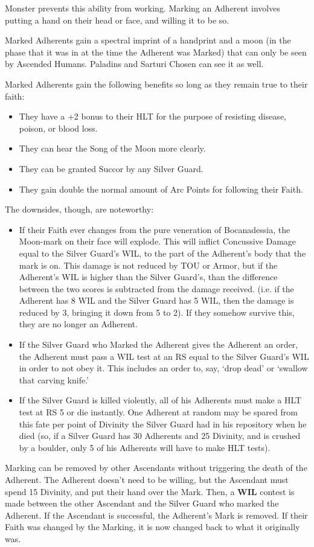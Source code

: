 \documentclass[oneside,11pt,english]{book}
\begin{document}
Monster prevents this ability from working. Marking an Adherent involves putting a hand on 
their head or face, and willing it to be so. 


Marked Adherents gain a spectral imprint of a handprint and a moon (in the phase that it was in at 
the time the Adherent was Marked) that can only be seen by Ascended Humans. Paladins and 
Sarturi Chosen can see it as well. 


Marked Adherents gain the following benefits so long as they remain true to their faith: 
\begin{itemize}
\item They have a +2 bonus to their HLT for the purpose of resisting disease, poison, or blood 
loss. 
\item They can hear the Song of the Moon more clearly. 
\item They can be granted Succor by any Silver Guard. 
\item They gain double the normal amount of Arc Points for following their Faith. 
\end{itemize}
The downsides, though, are noteworthy: 
\begin{itemize}
\item If their Faith ever changes from the pure veneration of Bocanadessia, the Moon-mark on 
their face will explode. This will inflict Concussive Damage equal to the Silver Guard's 
WIL, to the part of the Adherent's body that the mark is on. This damage is not reduced 
by TOU or Armor, but if the Adherent's WIL is higher than the Silver Guard's, than the 
difference between the two scores is subtracted from the damage received. (i.e. if the 
Adherent has 8 WIL and the Silver Guard has 5 WIL, then the damage is reduced by 3, 
bringing it down from 5 to 2). If they somehow survive this, they are no longer an 
Adherent. 
\item If the Silver Guard who Marked the Adherent gives the Adherent an order, the Adherent 
must pass a WIL test at an RS equal to the Silver Guard's WIL in order to not obey it. 
This includes an order to, say, ‘drop dead’ or ‘swallow that carving knife.’ 
\item If the Silver Guard is killed violently, all of his Adherents must make a HLT test at RS 5 
or die instantly. One Adherent at random may be spared from this fate per point of 
Divinity the Silver Guard had in his repository when he died (so, if a Silver Guard has 30 
Adherents and 25 Divinity, and is crushed by a boulder, only 5 of his Adherents will have 
to make HLT tests). 
\end{itemize}
Marking can be removed by other Ascendants without triggering the death of the Adherent. The 
Adherent doesn't need to be willing, but the Ascendant must spend 15 Divinity, and put their 
hand over the Mark. Then, a \textbf{WIL} contest is made between the other Ascendant and the Silver 
Guard who marked the Adherent. If the Ascendant is successful, the Adherent's Mark is removed. 
If their Faith was changed by the Marking, it is now changed back to what it originally was. 
\end{document}
